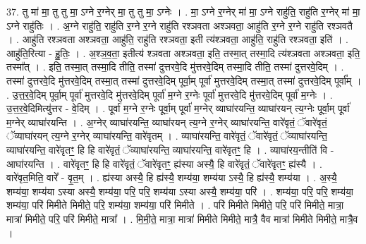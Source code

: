 \documentclass[17pt]{extarticle}
\begin{document}
37. तु मा॑ मा॒ तु तु मा॒ ऽग्ने र॒ग्नेर् मा॒ तु तु मा॒ ऽग्नेः । . मा॒ ऽग्ने र॒ग्नेर् मा॑ मा॒ ऽग्ने राहु॑ति॒ राहु॑ति र॒ग्नेर् मा॑ मा॒ ऽग्ने राहु॑तिः । . अ॒ग्ने राहु॑ति॒ राहु॑ति र॒ग्ने र॒ग्ने राहु॑ति रश्ञवता अश्ञवता॒ आहु॑ति र॒ग्ने र॒ग्ने राहु॑ति रश्ञवतै । . आहु॑ति रश्ञवता अश्ञवता॒ आहु॑ति॒ राहु॑ति रश्ञवता॒ इती त्य॑श्ञवता॒ आहु॑ति॒ राहु॑ति रश्ञवता॒ इति॑ । . आहु॑ति॒रित्या - हु॒तिः॒ । . अ॒श्ञ॒व॒ता॒ इतीत्य॑ श्ञवता अश्ञवता॒ इति॒ तस्मा॒त् तस्मा॒दि त्य॑श्ञवता अश्ञवता॒ इति॒ तस्मा᳚त् । . इति॒ तस्मा॒त् तस्मा॒दि तीति॒ तस्मा॑ दुत्तरवे॒दि मु॑त्तरवे॒दिम् तस्मा॒दि तीति॒ तस्मा॑ दुत्तरवे॒दिम् । . तस्मा॑ दुत्तरवे॒दि मु॑त्तरवे॒दिम् तस्मा॒त् तस्मा॑ दुत्तरवे॒दिम् पूर्वा॒म् पूर्वा॑ मुत्तरवे॒दिम् तस्मा॒त् तस्मा॑ दुत्तरवे॒दिम् पूर्वा᳚म् । . उ॒त्त॒र॒वे॒दिम् पूर्वा॒म् पूर्वा॑ मुत्तरवे॒दि मु॑त्तरवे॒दिम् पूर्वा॑ म॒ग्ने र॒ग्नेः पूर्वा॑ मुत्तरवे॒दि मु॑त्तरवे॒दिम् पूर्वा॑ म॒ग्नेः । . उ॒त्त॒र॒वे॒दिमित्यु॑त्तर - वे॒दिम् । . पूर्वा॑ म॒ग्ने र॒ग्नेः पूर्वा॒म् पूर्वा॑ म॒ग्नेर् व्याघा॑रयन्ति॒ व्याघा॑रयन् त्य॒ग्नेः पूर्वा॒म् पूर्वा॑ म॒ग्नेर् व्याघा॑रयन्ति । . अ॒ग्नेर् व्याघा॑रयन्ति॒ व्याघा॑रयन् त्य॒ग्ने र॒ग्नेर् व्याघा॑रयन्ति॒ वारे॑वृतं॒ ॅवारे॑वृतं॒ ॅव्याघा॑रयन् त्य॒ग्ने र॒ग्नेर् व्याघा॑रयन्ति॒ वारे॑वृतम् । . व्याघा॑रयन्ति॒ वारे॑वृतं॒ ॅवारे॑वृतं॒ ॅव्याघा॑रयन्ति॒ व्याघा॑रयन्ति॒ वारे॑वृतꣳ॒॒ हि हि वारे॑वृतं॒ ॅव्याघा॑रयन्ति॒ व्याघा॑रयन्ति॒ वारे॑वृतꣳ॒॒ हि । . व्याघा॑रय॒न्तीति॑ वि - आघा॑रयन्ति । . वारे॑वृतꣳ॒॒ हि हि वारे॑वृतं॒ ॅवारे॑वृतꣳ॒॒ ह्य॑स्या अस्यै॒ हि वारे॑वृतं॒ ॅवारे॑वृतꣳ॒॒ ह्य॑स्यै । . वारे॑वृत॒मिति॒ वारे᳚ - वृ॒त॒म् । . ह्य॑स्या अस्यै॒ हि ह्य॑स्यै॒ शम्य॑या॒ शम्य॑या ऽस्यै॒ हि ह्य॑स्यै॒ शम्य॑या । . अ॒स्यै॒ शम्य॑या॒ शम्य॑या ऽस्या अस्यै॒ शम्य॑या॒ परि॒ परि॒ शम्य॑या ऽस्या अस्यै॒ शम्य॑या॒ परि॑ । . शम्य॑या॒ परि॒ परि॒ शम्य॑या॒ शम्य॑या॒ परि॑ मिमीते मिमीते॒ परि॒ शम्य॑या॒ शम्य॑या॒ परि॑ मिमीते । . परि॑ मिमीते मिमीते॒ परि॒ परि॑ मिमीते॒ मात्रा॒ मात्रा॑ मिमीते॒ परि॒ परि॑ मिमीते॒ मात्रा᳚ । . मि॒मी॒ते॒ मात्रा॒ मात्रा॑ मिमीते मिमीते॒ मात्रै॒ वैव मात्रा॑ मिमीते मिमीते॒ मात्रै॒व । \newline
\pagebreak
{}
\end{document}
